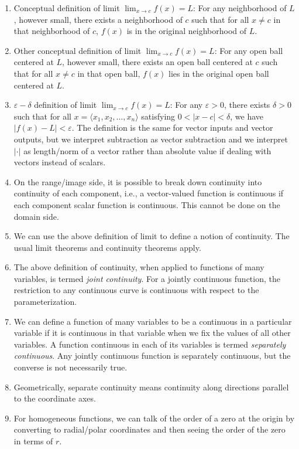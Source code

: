 \documentclass[10pt]{amsart}
\begin{document}
\begin{enumerate}
\item Conceptual definition of limit $\lim_{x \to c} f(x) = L$: For
  any neighborhood of $L$, however small, there exists a neighborhood
  of $c$ such that for all $x \ne c$ in that neighborhood of $c$,
  $f(x)$ is in the original neighborhood of $L$.
\item Other conceptual definition of limit $\lim_{x \to c} f(x) = L$:
  For any open ball centered at $L$, however small, there exists an
  open ball centered at $c$ such that for all $x \ne c$ in that open
  ball, $f(x)$ lies in the original open ball centered at $L$.
\item $\varepsilon-\delta$ definition of limit $\lim_{x \to c} f(x) = L$:
  For any $\varepsilon > 0$, there exists $\delta > 0$ such that for all
  $x = \langle x_1,x_2,\dots,x_n \rangle$ satisfying $0 < |x - c| <
  \delta$, we have $|f(x) - L| < \varepsilon$. The definition is the same
  for vector inputs and vector outputs, but we interpret subtraction
  as vector subtraction and we interpret $| \cdot |$ as length/norm of
  a vector rather than absolute value if dealing with vectors instead
  of scalars.
\item On the range/image side, it is possible to break down continuity
  into continuity of each component, i.e., a vector-valued function is
  continuous if each component scalar function is continuous. This
  cannot be done on the domain side.
\item We can use the above definition of limit to define a notion of
  continuity. The usual limit theorems and continuity theorems apply.
\item The above definition of continuity, when applied to functions of
  many variables, is termed {\em joint continuity}. For a jointly
  continuous function, the restriction to any continuous curve is
  continuous with respect to the parameterization.
\item We can define a function of many variables to be a continuous in
  a particular variable if it is continuous in that variable when we
  fix the values of all other variables. A function continuous in each
  of its variables is termed {\em separately continuous}. Any jointly
  continuous function is separately continuous, but the converse is
  not necessarily true.
\item Geometrically, separate continuity means continuity along
  directions parallel to the coordinate axes.
\item For homogeneous functions, we can talk of the order of a zero at
  the origin by converting to radial/polar coordinates and then seeing
  the order of the zero in terms of $r$.
\end{enumerate}
\end{document}

